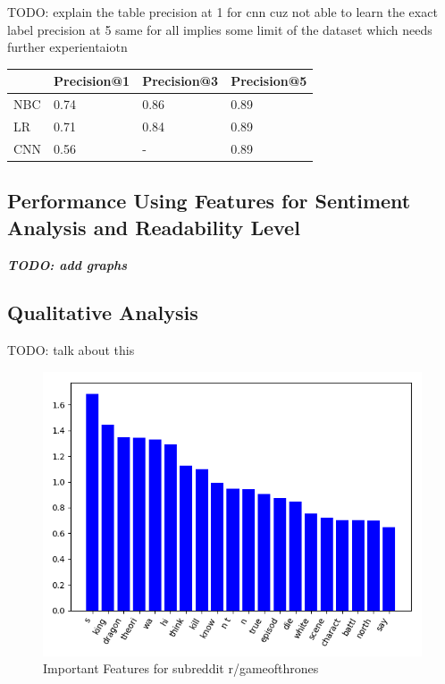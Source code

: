 \documentclass{sig-alternate-05-2015}
\begin{document}
TODO: explain the table
precision at 1 for cnn cuz not able to learn the exact label
precision at 5 same for all implies some limit of the dataset which needs further experientaiotn

\begin{table}[H]
\begin{tabular}{|l|l|l|l|}
\hline
    & Precision@1 & Precision@3 & Precision@5 \\ \hline
NBC & 0.74        & 0.86        & 0.89        \\ \hline
LR  & 0.71        & 0.84        & 0.89       \\ \hline
CNN & 0.56        & -           & 0.89        \\ \hline
\end{tabular}
\end{table}

\subsection{Performance Using Features for Sentiment Analysis and Readability Level}

\textit{\textbf{TODO: add graphs}}

\subsection{Qualitative Analysis}
TODO: talk about this

\begin{figure}[H]
\centering
\includegraphics[width=\linewidth]{plots/coefficients-gameofthrones-dim-337.png}
\caption{Important Features for subreddit r/gameofthrones}
\end{figure}
\end{document}

